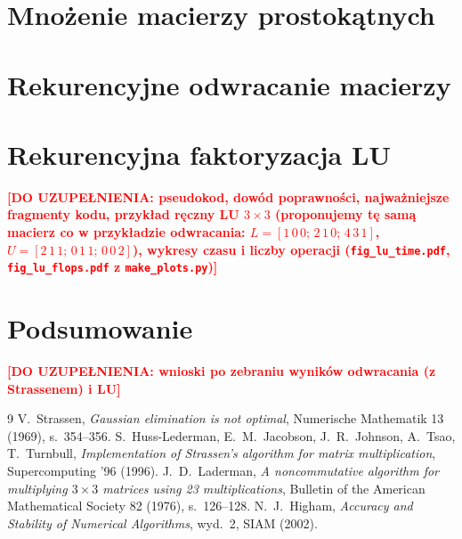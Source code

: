 \documentclass[11pt,a4paper]{article}
\newcommand{\todo}[1]{\textcolor{red}{\textbf{[DO UZUPEŁNIENIA: #1]}}}
\begin{document}
\section{Mnożenie macierzy prostokątnych}\label{sec:mnozenie}


\clearpage
\section{Rekurencyjne odwracanie macierzy}\label{sec:odwracanie}


\clearpage
\section{Rekurencyjna faktoryzacja LU}\label{sec:lu}
\todo{pseudokod, dowód poprawności, najważniejsze fragmenty kodu, przykład ręczny LU $3\times3$ (proponujemy tę samą
macierz co w przykładzie odwracania: $L=[1\,0\,0;\,2\,1\,0;\,4\,3\,1]$, $U=[2\,1\,1;\,0\,1\,1;\,0\,0\,2]$),
wykresy czasu i liczby operacji (\texttt{fig\_lu\_time.pdf}, \texttt{fig\_lu\_flops.pdf} z \texttt{make\_plots.py})}

\section{Podsumowanie}
\todo{wnioski po zebraniu wyników odwracania (z Strassenem) i LU}

\begin{thebibliography}{9}
 V.~Strassen, \emph{Gaussian elimination is not optimal}, Numerische Mathematik 13 (1969), s.~354--356.
 S.~Huss-Lederman, E.~M.~Jacobson, J.~R.~Johnson, A.~Tsao, T.~Turnbull,
\emph{Implementation of Strassen's algorithm for matrix multiplication}, Supercomputing '96 (1996).
 J.~D.~Laderman, \emph{A noncommutative algorithm for multiplying $3\times3$ matrices using 23
multiplications}, Bulletin of the American Mathematical Society 82 (1976), s.~126--128.
 N.~J.~Higham, \emph{Accuracy and Stability of Numerical Algorithms}, wyd.~2, SIAM (2002).
\end{thebibliography}
\end{document}
